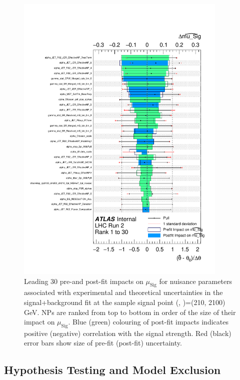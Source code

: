 \begin{figure}[h]
  \centering
  \includegraphics[width=0.9\textwidth]{Figures/8/ranking_mu_Sig_rank_0001_to_0030_zp2100_dm200_dh210_unblinded.pdf}
  \caption[Pre- and post-fit impacts for unblinded CRs (\ms, \mZp)=(210, 2100) GeV]{Leading 30 pre-and post-fit impacts on \(\mu_\text{Sig}\) for nuisance parameters associated with experimental and theoretical uncertainties in the signal+background fit at the sample signal point (\ms, \mZp)=(210, 2100) GeV. NPs are ranked from top to bottom in order of the size of their impact on \(\mu_\text{Sig}\). Blue (green) colouring of post-fit impacts indicates positive (negative) correlation with the signal strength. Red (black) error bars show size of pre-fit (post-fit) uncertainty.}
  \label{fig:ranking_ms210}
\end{figure}

\subsection{Hypothesis Testing and Model Exclusion}

